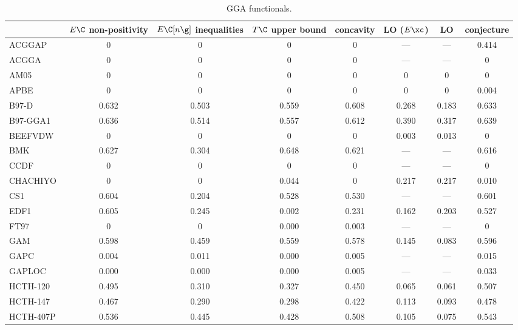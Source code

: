 \begin{table}
\caption{GGA functionals.}
\begin{tabular}{|l|c|c|c|c|c|c|c|}
\toprule
 & $E\C$ non-positivity & $E\C[n\g]$ inequalities & $T\C$ upper bound & concavity & LO ($E\xc$) & LO & conjecture \\
\midrule
ACGGAP~\cite{Cancio2018_084116,Burke2014_4834} & 0 & 0 & 0 & 0 & --- & --- & 0.414 \\
ACGGA~\cite{Cancio2018_084116,Burke2014_4834} & 0 & 0 & 0 & 0 & --- & --- & 0 \\
AM05~\cite{Armiento2005_085108,Mattsson2008_084714} & 0 & 0 & 0 & 0 & 0 & 0 & 0 \\
APBE~\cite{Constantin2011_186406} & 0 & 0 & 0 & 0 & 0 & 0 & 0.004 \\
B97-D~\cite{Grimme2006_1787} & 0.632 & 0.503 & 0.559 & 0.608 & 0.268 & 0.183 & 0.633 \\
B97-GGA1~\cite{Cohen2000_160} & 0.636 & 0.514 & 0.557 & 0.612 & 0.390 & 0.317 & 0.639 \\
BEEFVDW~\cite{Wellendorff2012_235149} & 0 & 0 & 0 & 0 & 0.003 & 0.013 & 0 \\
BMK~\cite{Boese2004_3405} & 0.627 & 0.304 & 0.648 & 0.621 & --- & --- & 0.616 \\
CCDF~\cite{Margraf2019_244116} & 0 & 0 & 0 & 0 & --- & --- & 0 \\
CHACHIYO~\cite{Chachiyo2020_112669} & 0 & 0 & 0.044 & 0 & 0.217 & 0.217 & 0.010 \\
CS1~\cite{Handy2002_5411,Proynov2006_436} & 0.604 & 0.204 & 0.528 & 0.530 & --- & --- & 0.601 \\
EDF1~\cite{Adamson1998_6} & 0.605 & 0.245 & 0.002 & 0.231 & 0.162 & 0.203 & 0.527 \\
FT97~\cite{Filatov1997_603,Filatov1997_847} & 0 & 0 & 0.000 & 0.003 & --- & --- & 0 \\
GAM~\cite{Yu2015_12146} & 0.598 & 0.459 & 0.559 & 0.578 & 0.145 & 0.083 & 0.596 \\
GAPC~\cite{Fabiano2014_2016} & 0.004 & 0.011 & 0.000 & 0.005 & --- & --- & 0.015 \\
GAPLOC~\cite{Fabiano2014_2016} & 0.000 & 0.000 & 0.000 & 0.005 & --- & --- & 0.033 \\
HCTH-120~\cite{Boese2000_1670} & 0.495 & 0.310 & 0.327 & 0.450 & 0.065 & 0.061 & 0.507 \\
HCTH-147~\cite{Boese2000_1670} & 0.467 & 0.290 & 0.298 & 0.422 & 0.113 & 0.093 & 0.478 \\
HCTH-407P~\cite{Boese2003_5965} & 0.536 & 0.445 & 0.428 & 0.508 & 0.105 & 0.075 & 0.543 \\

\end{tabular}
\end{table}
